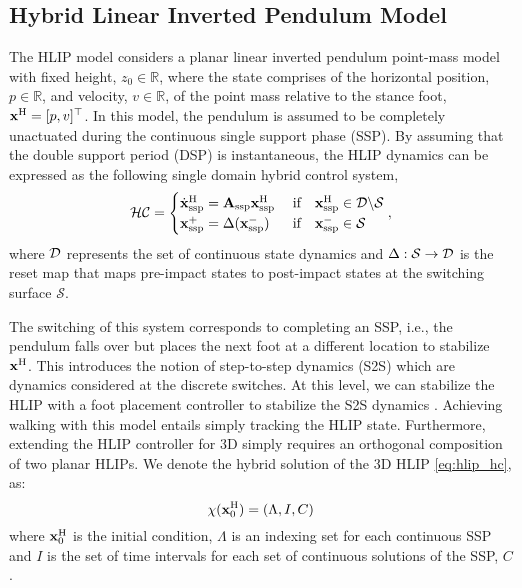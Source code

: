 
\subsection{Hybrid Linear Inverted Pendulum Model}
The HLIP model considers a planar linear inverted pendulum point-mass model with fixed height, $z_0 \in \mathbb{R}$, where the state comprises of the horizontal position, $p \in \mathbb{R}$, and velocity, $v \in \mathbb{R}$, of the point mass relative to the stance foot, $\mathbf{x}^{\mathrm{H}} = [p, v]^\top$. In this model, the pendulum is assumed to be completely unactuated during the continuous single support phase (SSP). By assuming that the double support period (DSP) is instantaneous, the HLIP dynamics can be expressed as the following single domain hybrid control system,
\begin{equation} \label{eq:hlip_hc}
    \mathcal{HC} 
    =
    \begin{cases} 
        \dot{\mathbf{x}}_{\mathrm{ssp}}^{\mathrm{H}} = \mathbf{A}_{\mathrm{ssp}}\mathbf{x}_{\mathrm{ssp}}^{\mathrm{H}} & \; \text{if} \quad \mathbf{x}_{\mathrm{ssp}}^{\mathrm{H}} \in \mathcal{D} \backslash \mathcal{S} \\
        \mathbf{x}^+_{\mathrm{ssp}} = \Delta(\mathbf{x}^-_{\mathrm{ssp}}) & \; \text{if} \quad  \mathbf{x}^-_{\mathrm{ssp}} \in \mathcal{S} 
    \end{cases},
\end{equation}
where $\mathcal{D}$ represents the set of continuous state dynamics and $\Delta: \mathcal{S} \rightarrow \mathcal{D}$ is the reset map that maps pre-impact states to post-impact states at the switching surface $\mathcal{S}$. 

The switching of this system corresponds to completing an SSP, i.e., the pendulum falls over but places the next foot at a different location to stabilize $\mathbf{x}^{\mathrm{H}}$. This introduces the notion of step-to-step dynamics (S2S) which are dynamics considered at the discrete switches. At this level, we can stabilize the HLIP with a foot placement controller to stabilize the S2S dynamics \cite{xiong_3-d_2022}. Achieving walking with this model entails simply tracking the HLIP state. Furthermore, extending the HLIP controller for 3D simply requires an orthogonal composition of two planar HLIPs. We denote the hybrid solution of the 3D HLIP \eqref{eq:hlip_hc}, as:
%
\begin{equation} \label{eq:HLIP_solution}
    \chi(\mathbf{x}_0^{\mathrm{H}}) = (\Lambda, I, C)
\end{equation}
%
where $\mathbf{x}_0^{\mathrm{H}}$ is the initial condition, $\Lambda$ is an indexing set for each continuous SSP and $I$ is the set of time intervals for each set of continuous solutions of the SSP, $C$. 

